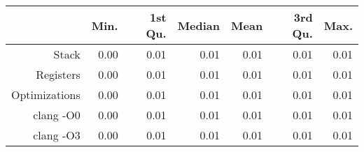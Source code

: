 \begin{table}[ht]
\centering
\begin{tabular}{rrrrrrr}
  \hline
 & Min. & 1st Qu. & Median & Mean & 3rd Qu. & Max. \\ 
  \hline
Stack & 0.00 & 0.01 & 0.01 & 0.01 & 0.01 & 0.01 \\ 
  Registers & 0.00 & 0.01 & 0.01 & 0.01 & 0.01 & 0.01 \\ 
  Optimizations & 0.00 & 0.01 & 0.01 & 0.01 & 0.01 & 0.01 \\ 
  clang -O0 & 0.00 & 0.01 & 0.01 & 0.01 & 0.01 & 0.01 \\ 
  clang -O3 & 0.00 & 0.01 & 0.01 & 0.01 & 0.01 & 0.01 \\ 
   \hline
\end{tabular}
\end{table}
